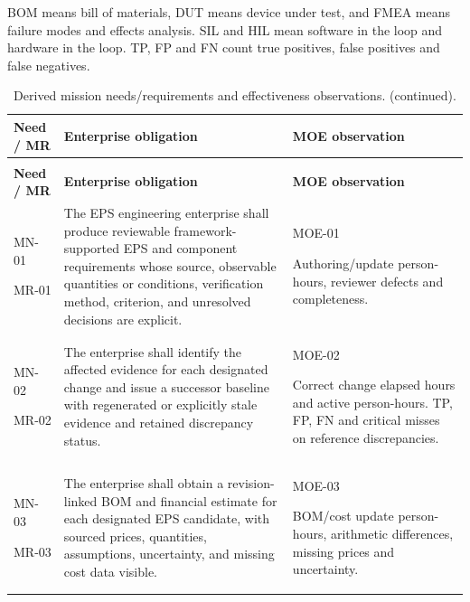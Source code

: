 BOM means bill of materials, DUT means device under test, and FMEA means failure modes and effects analysis. SIL and HIL mean software in the loop and hardware in the loop. TP, FP and FN count true positives, false positives and false negatives.
{\small
\setlength{\tabcolsep}{4pt}
\setlength{\parskip}{0pt}
\setlength{\LTpre}{0.4\baselineskip}
\setlength{\LTpost}{0.4\baselineskip}
\renewcommand{\arraystretch}{1.06}
\begin{longtable}{@{}>{\raggedright\arraybackslash}p{}>{\raggedright\arraybackslash}p{}>{\raggedright\arraybackslash}p{}@{}}
\caption{Derived mission needs/requirements and effectiveness observations.}\label{tab:framework-mission-requirements}\\
\toprule
\textbf{Need / MR} & \textbf{Enterprise obligation} & \textbf{MOE observation} \\
\midrule
\endfirsthead
\caption[]{Derived mission needs/requirements and effectiveness observations. (continued).}\\
\toprule
\textbf{Need / MR} & \textbf{Enterprise obligation} & \textbf{MOE observation} \\
\midrule
\endhead
\bottomrule
\endfoot
MN-01\par MR-01 & The EPS engineering enterprise shall produce reviewable framework-supported EPS and component requirements whose source, observable quantities or conditions, verification method, criterion, and unresolved decisions are explicit. & MOE-01\par Authoring/update person-hours, reviewer defects and completeness. \\
MN-02\par MR-02 & The enterprise shall identify the affected evidence for each designated change and issue a successor baseline with regenerated or explicitly stale evidence and retained discrepancy status. & MOE-02\par Correct change elapsed hours and active person-hours. TP, FP, FN and critical misses on reference discrepancies. \\
MN-03\par MR-03 & The enterprise shall obtain a revision-linked BOM and financial estimate for each designated EPS candidate, with sourced prices, quantities, assumptions, uncertainty, and missing cost data visible. & MOE-03\par BOM/cost update person-hours, arithmetic differences, missing prices and uncertainty. \\

\end{longtable}}
